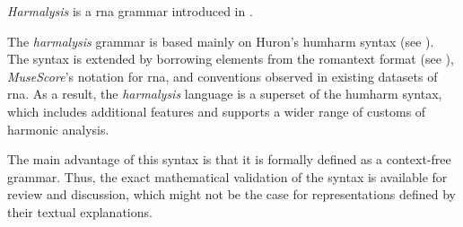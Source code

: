 

\emph{Harmalysis} is a \gls{rna} grammar introduced in
\textcite{napoleslopez2020harmalysis}.

The \emph{harmalysis} grammar is based mainly on Huron's
\gls{humharm} syntax (see ).
The syntax is extended by borrowing elements from the
\gls{romantext} format (see ),
\emph{MuseScore}'s notation for
\gls{rna},
and conventions observed in existing datasets of \gls{rna}.
As  a result,  the \emph{harmalysis} language is a superset
of the \gls{humharm} syntax,  which includes additional
features and supports a wider range of customs of harmonic
analysis.

The main advantage of this syntax is that it is formally
defined as a context-free grammar. Thus, the exact
mathematical validation of the syntax is available for
review and discussion, which might not be the case for
representations defined by their textual explanations.
